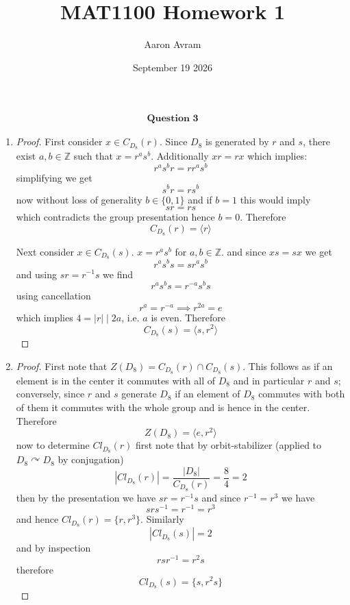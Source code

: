 \documentclass[12pt]{article}
\title{MAT1100 Homework 1}
\author{Aaron Avram}
\date{September 19 2026}
\begin{document}
\newtheorem{definition}{Definition}
\newtheorem{theorem}{Theorem}
\newtheorem{claim}{Claim}
\newtheorem{corollary}{Corollary}

\maketitle

\begin{align*}
    \textbf{Question 3}
\end{align*}

\begin{enumerate}
    \item[(a)]
    \begin{proof}
        First consider $x \in C_{D_8}(r)$. Since $D_8$ is generated by $r$ and $s$, there exist $a, b \in \mathbb Z$
        such that $x = r^as^b$. Additionally $xr = rx$ which implies:
        \[ r^as^br = rr^as^b \]
        simplifying we get
        \[ s^br = rs^b \]
        now without loss of generality $b \in \{ 0, 1\}$
        and if $b = 1$ this would imply
        \[ sr = rs \]
        which contradicts the group presentation
        hence $b = 0$. Therefore
        \[ C_{D_8}(r) = \langle r \rangle \]

        Next consider $x \in C_{D_8}(s)$. $x = r^as^b$ for $a, b \in \mathbb Z$.
        and since $xs = sx$ we get
        \[ r^as^bs = sr^as^b \]
        and using $sr = r^{-1}s$ we find
        \[ r^as^bs = r^{-a}s^bs \]
        using cancellation
        \[ r^a = r^{-a} \implies r^{2a} = e \]
        which implies $4 = |r| \mid 2a$, i.e. $a$ is even. 
        Therefore
        \[ C_{D_8}(s) = \langle s, r^2 \rangle \]
    \end{proof}

    \item[(b)]
    \begin{proof}
        First note that $Z(D_8) = C_{D_8}(r) \cap C_{D_8}(s)$. This follows as if an element is in the center
        it commutes with all of $D_8$ and in particular $r$ and $s$; conversely, since $r$ and $s$ generate $D_8$
        if an element of $D_8$ commutes with both of them it commutes with the whole group and is hence in the center.
        Therefore
        \[ Z(D_8) = \langle e, r^2 \rangle \]
        now to determine $Cl_{D_8}(r)$ first note that by orbit-stabilizer (applied to $D_8 \curvearrowright D_8$ by conjugation)
        \[ |Cl_{D_8}(r)| = \frac{|D_8|}{C_{D_8}(r)} = \frac{8}{4} = 2 \]
        then by the presentation we have $sr = r^{-1}s$ and since $r^{-1} = r^3$ we have
        \[ srs^{-1} = r^{-1} = r^3 \]
        and hence $Cl_{D_8}(r) = \{ r, r^3 \}$. Similarly
        \[ |Cl_{D_8}(s)| = 2 \]
        and by inspection
        \[ rsr^{-1} = r^2s \]
        therefore
        \[ Cl_{D_8}(s) = \{ s, r^2s \} \]


\end{proof}
\end{enumerate}
\end{document}

